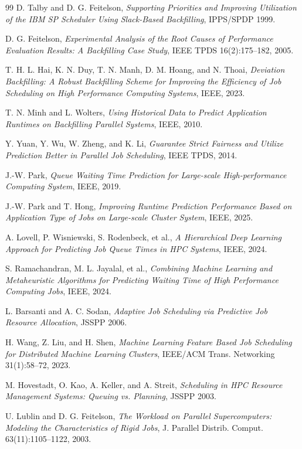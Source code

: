 \documentclass[11pt,twocolumn]{article}
\begin{document}
\begin{thebibliography}{99}
 D. Talby and D. G. Feitelson, \emph{Supporting Priorities and Improving Utilization of the IBM SP Scheduler Using Slack-Based Backfilling}, IPPS/SPDP 1999.

 D. G. Feitelson, \emph{Experimental Analysis of the Root Causes of Performance Evaluation Results: A Backfilling Case Study}, IEEE TPDS 16(2):175--182, 2005.

 T. H. L. Hai, K. N. Duy, T. N. Manh, D. M. Hoang, and N. Thoai, \emph{Deviation Backfilling: A Robust Backfilling Scheme for Improving the Efficiency of Job Scheduling on High Performance Computing Systems}, IEEE, 2023.

 T. N. Minh and L. Wolters, \emph{Using Historical Data to Predict Application Runtimes on Backfilling Parallel Systems}, IEEE, 2010.

 Y. Yuan, Y. Wu, W. Zheng, and K. Li, \emph{Guarantee Strict Fairness and Utilize Prediction Better in Parallel Job Scheduling}, IEEE TPDS, 2014.

 J.-W. Park, \emph{Queue Waiting Time Prediction for Large-scale High-performance Computing System}, IEEE, 2019.

 J.-W. Park and T. Hong, \emph{Improving Runtime Prediction Performance Based on Application Type of Jobs on Large-scale Cluster System}, IEEE, 2025.

 A. Lovell, P. Wisniewski, S. Rodenbeck, et al., \emph{A Hierarchical Deep Learning Approach for Predicting Job Queue Times in HPC Systems}, IEEE, 2024.

 S. Ramachandran, M. L. Jayalal, et al., \emph{Combining Machine Learning and Metaheuristic Algorithms for Predicting Waiting Time of High Performance Computing Jobs}, IEEE, 2024.

 L. Barsanti and A. C. Sodan, \emph{Adaptive Job Scheduling via Predictive Job Resource Allocation}, JSSPP 2006.

 H. Wang, Z. Liu, and H. Shen, \emph{Machine Learning Feature Based Job Scheduling for Distributed Machine Learning Clusters}, IEEE/ACM Trans. Networking 31(1):58--72, 2023.

 M. Hovestadt, O. Kao, A. Keller, and A. Streit, \emph{Scheduling in HPC Resource Management Systems: Queuing vs. Planning}, JSSPP 2003.

 U. Lublin and D. G. Feitelson, \emph{The Workload on Parallel Supercomputers: Modeling the Characteristics of Rigid Jobs}, J. Parallel Distrib. Comput. 63(11):1105--1122, 2003.


\end{thebibliography}
\end{document}
